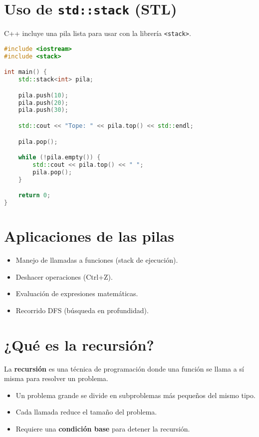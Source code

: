 \documentclass[a4paper]{article}
\begin{document}
\section{Uso de \texttt{std::stack} (STL)}

C++ incluye una pila lista para usar con la librería \texttt{<stack>}.

\begin{lstlisting}[language=C++]
#include <iostream>
#include <stack>

int main() {
    std::stack<int> pila;

    pila.push(10);
    pila.push(20);
    pila.push(30);

    std::cout << "Tope: " << pila.top() << std::endl;

    pila.pop();

    while (!pila.empty()) {
        std::cout << pila.top() << " ";
        pila.pop();
    }

    return 0;
}
\end{lstlisting}

\section{Aplicaciones de las pilas}

\begin{itemize}
    \item Manejo de llamadas a funciones (stack de ejecución).
    \item Deshacer operaciones (Ctrl+Z).
    \item Evaluación de expresiones matemáticas.
    \item Recorrido DFS (búsqueda en profundidad).
\end{itemize}
\newpage
\section{¿Qué es la recursión?}

La \textbf{recursión} es una técnica de programación donde una función se llama a sí misma para resolver un problema.

\begin{itemize}
    \item Un problema grande se divide en subproblemas más pequeños del mismo tipo.
    \item Cada llamada reduce el tamaño del problema.
    \item Requiere una \textbf{condición base} para detener la recursión.
\end{itemize}
\end{document}
